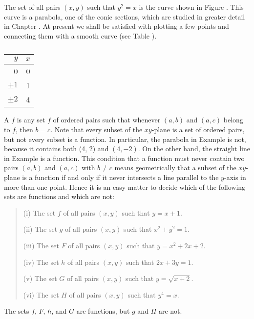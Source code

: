 
\begin{example}
\label{exam 1.2.4}
The set of all pairs $(x, y)$
such that $y^2 = x$ is the curve shown in Figure .
This curve is a parabola,
one of the conic sections,
which are studied in greater detail in Chapter .
At present we shall be satisfied with plotting a few points and connecting
them with a smooth curve (see Table ).


\begin{table}
\centering
\begin{tabular}{r|r} \hline
$y$        &  $x$      \\ \hline
  0          &   0         \\
$\pm1$  &   1         \\
$\pm2$  &   4         \\ \hline
\end{tabular}
\caption{}
\label{table 1.2}
\end{table}
\end{example}

A  $f$ is any set $f$ of ordered pairs
such that whenever $(a, b)$ and $(a, c)$ belong to $f$,
then $b = c$.
Note that every subset of the $xy$-plane is a set of ordered pairs,
but not every subset is a function.
In particular, the parabola in Example  is not,
because it contains both (4, 2) and $(4, -2)$.
On the other hand,
the straight line in Example  is a function.
This condition that a function
must never contain two pairs $(a, b)$ and $(a, c)$ with $b \neq c$
means geometrically that a subset of the $xy$-plane is a function
if and only if it never intersects a line parallel to the $y$-axis
in more than one point.
Hence it is an easy matter to decide which of the following sets
are functions and which are not:
\begin{quote}
(i) The set $f$ of all pairs $(x, y)$ such that $y = x + 1$.

(ii) The set $g$ of all pairs $(x, y)$ such that $x^2 + y^2 = 1$.

(iii) The set $F$ of all pairs $(x, y)$ such that $y = x^2 + 2x + 2$.

(iv) The set $h$ of all pairs $(x, y)$ such that $2x + 3y = 1$.

(v) The set $G$ of all pairs $(x, y)$ such that $y = \sqrt {x + 2}$.

(vi) The set $H$ of all pairs $(x, y)$ such that $y^4 = x$.
\end{quote}
The sets $f$, $F$, $h$, and $G$ are functions,
but $g$ and $H$ are not.

